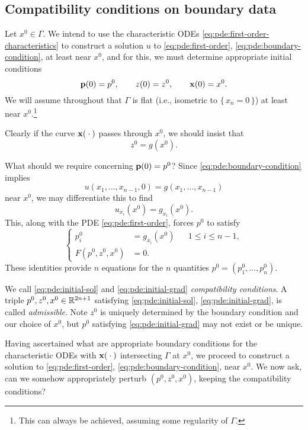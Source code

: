 \subsection{Compatibility conditions on boundary data}
Let \(x^0\in\Gamma\). We intend to use the characteristic ODEs
\eqref{eq:pde:first-order-characteristics} to construct a solution \(u\) to
\eqref{eq:pde:first-order}, \eqref{eq:pde:boundary-condition}, at least
near \(x^0\), and for this, we must determine appropriate initial
conditions
\begin{equation}
  \label{eq:pde:first-order-linear-characteristics}
  \mathbf{p}(0)=p^0,\qquad
  z(0)=z^0,\qquad
  \mathbf{x}(0)=x^0.
\end{equation}
We will assume throughout that \(\Gamma\) is flat (i.e., isometric to
\(\{\,x_n=0\,\}\)) at least near \(x^0\).\footnote{This can always be
  achieved, assuming some regularity of \(\Gamma\).}

Clearly if the curve \(\mathbf{x}({}\cdot{})\) passes through \(x^0\), we should
insist that
\begin{equation}
  \label{eq:pde:initial-sol}
  z^0=g(x^0).
\end{equation}

What should we require concerning \(\mathbf{p}(0)=p^0\)? Since
\eqref{eq:pde:boundary-condition} implies
\[
  u(x_1,\dotsc,x_{n-1},0)=g(x_1,\dotsc,x_{n-1})
\]
near \(x^0\), we may differentiate this to find
\[
  u_{x_i}(x^0)=g_{x_i}(x^0).
\]
This, along with the PDE \eqref{eq:pde:first-order}, forces \(p^0\) to
satisfy
\begin{equation}
  \label{eq:pde:initial-grad}
  \left\{
    \begin{aligned}
      p_i^0&=g_{x_i}(x^0)&&1\leq i\leq n-1,\\
      F(p^0,z^0,x^0)&=0.
    \end{aligned}
  \right.
\end{equation}
These identities provide \(n\) equations for the \(n\) quantities
\(p^0=(p_1^0,\dotsc,p_n^0)\).

We call \eqref{eq:pde:initial-sol} and \eqref{eq:pde:initial-grad}
\emph{compatibility conditions}. A triple \(p^0,z^0,x^0\in\mathbb{R}^{2n+1}\)
satisfying \eqref{eq:pde:initial-sol}, \eqref{eq:pde:initial-grad}, is
called \emph{admissible}. Note \(z^0\) is uniquely determined by the
boundary condition and our choice of \(x^0\), but \(p^0\) satisfying
\eqref{eq:pde:initial-grad} may not exist or be unique.

Having ascertained what are appropriate boundary conditions for the
characteristic ODEs with \(\mathbf{x}({}\cdot{})\) intersecting \(\Gamma\) at
\(x^0\), we proceed to construct a solution to \eqref{eq:pde:first-order},
\eqref{eq:pde:boundary-condition}, near \(x^0\). We now ask, can we somehow
appropriately perturb \((p^0,z^0,x^0)\), keeping the compatibility
conditions?

